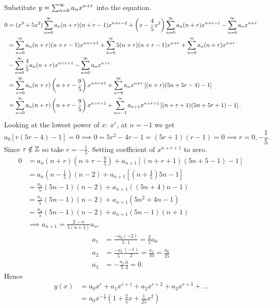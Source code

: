 \documentclass[10pt, a4paper]{article}
\begin{document}
\begin{problem}[Resit $2021$]
\begin{solution}
        Substitute $y = \infsum[n = 0]a_nx ^ {n + r}$ into the equation.
        \begin{align*}
            0 &= (x ^ 3 + 5x ^ 2)\infsum[n = 0]a_n(n + r)(n + r - 1)x ^ {n + r - 2} + \left(x - \frac{4}{5}x ^ 2\right)\infsum[n = 0]a_n(n + r)x ^ {n + r - 1} - \infsum[n = 0]a_nx ^ {n + r} \\
            &= \infsum[n = 0]a_n(n + r)(n + r - 1)x ^ {n + r + 1} + \infsum[n = 0]5(n + r)(n + r - 1)x ^ {n + r} + \infsum[n = 0]a_n(n + r)x ^ {n + r} \\
            &- \infsum[n = 0]\frac{4}{5}a_n(n + r)x ^ {n + r + 1} - \infsum[n = 0]a_nx ^ {n + r} \\
            &= \infsum[n = 0]a_n(n + r)\left(n + r - \frac{9}{5}\right)x ^ {n + r + 1} + \infsum[n = 0]a_nx ^ {n + r}\left[(n + r)(5n + 5r - 4) - 1\right] \\
            &= \infsum[n = 0]a_n(n + r)\left(n + r - \frac{9}{5}\right)x ^ {n + r + 1} + \infsum[n = -1]a_{n + 1}x ^ {n + r + 1}\left[(n + r + 1)(5n + 5r + 1) - 1\right].
        \end{align*}
        Looking at the lowest power of $x$:
        $x ^ r$,
        at $n = -1$ we get
        \[
        a_0\left[r(5r - 4) - 1\right] = 0 \implies 0 = 5r ^ 2 - 4r - 1 = (5r + 1)(r - 1) = 0 \implies r = 0, -\frac{1}{5}.
        \]
        Since $r \notin \Z$ so take $r = -\frac{1}{5}$.
        Setting coefficient of $x ^ {n + r + 1}$ to zero.
        \begin{align*}
            0 &= a_n(n + r)\left(n + r - \frac{9}{5}\right) + a_{n + 1}\left[(n + r + 1)(5n + 5 - 1) - 1\right] \\
            &= a_n\left(n - \frac{1}{5}\right)(n - 2) + a_{n + 1}\left[\left(n + \frac{4}{5}\right)5n - 1\right] \\
            &= \frac{a_n}{5}(5n - 1)(n - 2) + a_{n + 1}((5n + 4)n - 1) \\
            &= \frac{a_n}{5}(5n - 1)(n - 2) + a_{n + 1}(5n ^ 2 + 4n - 1) \\
            &= \frac{a_n}{5}(5n - 1)(n - 2) + a_{n + 1}(5n - 1)(n + 1) \\
            &\implies a_{n + 1} = \frac{2 - n}{5(n + 1)}a_n.
        \end{align*}
        \begin{align*}
            a_1 &= \frac{-a_0(-2)}{5 \cdot 1} = \frac{2}{5}a_0 \\
            a_2 &= \frac{-a_1}{5}\frac{(-1)}{2} = \frac{a_1}{10} = \frac{a_0}{25} \\
            a_3 &= -\frac{a_2}{5}\frac{0}{3} = 0.
        \end{align*}
        Hence
        \begin{align*}
            y(x) &= a_0x ^ r + a_1x ^ {r + 1} + a_2x ^ {r + 2} + a_3x ^ {r + 3} + \dotsc \\
            &= a_0x ^ {-\frac{1}{5}}\left(1 + \frac{2}{5}x + \frac{1}{25}x ^ 2\right)
        \end{align*}
    \end{solution}
\end{problem}
\end{document}
